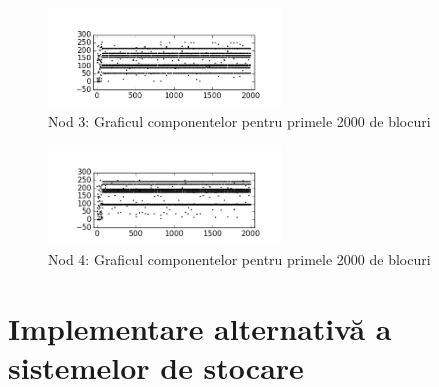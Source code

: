 \documentclass[oneside, 12pt]{book}
\begin{document}
\begin{figure}[t!]
\begin{center}
\includegraphics[width=0.55\textwidth]{img/carouri_db3.png}    %
\caption{Nod 3: Graficul componentelor pentru primele 2000 de blocuri} 
\label{fig:carouri_db3}
\end{center}
\end{figure}

\begin{figure}[t!]
\begin{center}
\includegraphics[width=0.55\textwidth]{img/carouri_db4.png}    %
\caption{Nod 4: Graficul componentelor pentru primele 2000 de blocuri} 
\label{fig:carouri_db4}
\end{center}
\end{figure}





\chapter{Implementare alternativă a sistemelor de stocare}
\label{cha:alternave-implementations}
\end{document}
